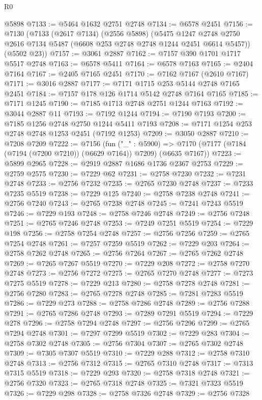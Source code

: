 \begin{lexlean}{R0}
\begin{coremodule}
    @5898
@7133 := @5464 @1632 @2751 @2748
@7134 := @6578 @2451
@7156 := @7130
    (@7133
      (@2617 @7134)
      (@2556 @5898)
      (@5475 @1247 @2748 @2750 @2616 @7134 @5487 (@6608 @253 @2748 @2748 @1244 @2451 @6614 @5457))
      (@5502 @23))
@7157 := @3061 @2887
@7162 := @7157 @390 @1701 @1717 @5517 @2748
@7163 := @6578 @5411
@7164 := @6578 @7163
@7165 := @2404 @7164
@7167 := @2405 @7165 @2451
@7170 := @7162 @7167 (@2610 @7167)
@7171 := @3016 @2887
@7177 := @7171 @1715 @253 @5144 @2748 @7165 @2451
@7184 := @7157 @178 @126 @1714 @5142 @2748 @7164 @7165
@7185 := @7171 @1245
@7190 := @7185 @1713 @2748 @2751 @1244 @7163
@7192 := @3044 @2887 @11
@7193 := @7192 @1244
@7194 := @7190 @7193
@7200 := @7185 @1256 @2748 @2750 @1244 @5411 @7193
@7208 := @7171 @1254 @253 @2748 @2748 @1253 @2451 (@7192 @1253)
@7209 := @3050 @2887
@7210 := @7208 @7209
@7222 := @7156
    (fun ("_" : @5900) =>
    @7170 (@7177 (@7184 (@7194 (@7200 @7210)) (@6629 @7164)) @7209) (@6635 @7167))
@7223 := @5899 @2965
@7228 := @2919 @2887 @1686 @1736 @2367 @2753
@7229 := @2759 @2575
@7230 := @7229 @62
@7231 := @2758 @7230
@7232 := @7231 @2748
@7233 := @2756 @7232
@7235 := @2765 @7230 @2748
@7237 := @7233 @7235 @5519
@7238 := @7229 @125
@7240 := @2758 @7238 @2748
@7241 := @2756 @7240
@7243 := @2765 @7238 @2748
@7245 := @7241 @7243 @5519
@7246 := @7229 @193
@7248 := @2758 @7246 @2748
@7249 := @2756 @7248
@7251 := @2765 @7246 @2748
@7253 := @7249 @7251 @5519
@7254 := @7229 @198
@7256 := @2758 @7254 @2748
@7257 := @2756 @7256
@7259 := @2765 @7254 @2748
@7261 := @7257 @7259 @5519
@7262 := @7229 @203
@7264 := @2758 @7262 @2748
@7265 := @2756 @7264
@7267 := @2765 @7262 @2748
@7269 := @7265 @7267 @5519
@7270 := @7229 @208
@7272 := @2758 @7270 @2748
@7273 := @2756 @7272
@7275 := @2765 @7270 @2748
@7277 := @7273 @7275 @5519
@7278 := @7229 @213
@7280 := @2758 @7278 @2748
@7281 := @2756 @7280
@7283 := @2765 @7278 @2748
@7285 := @7281 @7283 @5519
@7286 := @7229 @273
@7288 := @2758 @7286 @2748
@7289 := @2756 @7288
@7291 := @2765 @7286 @2748
@7293 := @7289 @7291 @5519
@7294 := @7229 @278
@7296 := @2758 @7294 @2748
@7297 := @2756 @7296
@7299 := @2765 @7294 @2748
@7301 := @7297 @7299 @5519
@7302 := @7229 @283
@7304 := @2758 @7302 @2748
@7305 := @2756 @7304
@7307 := @2765 @7302 @2748
@7309 := @7305 @7307 @5519
@7310 := @7229 @288
@7312 := @2758 @7310 @2748
@7313 := @2756 @7312
@7315 := @2765 @7310 @2748
@7317 := @7313 @7315 @5519
@7318 := @7229 @293
@7320 := @2758 @7318 @2748
@7321 := @2756 @7320
@7323 := @2765 @7318 @2748
@7325 := @7321 @7323 @5519
@7326 := @7229 @298
@7328 := @2758 @7326 @2748
@7329 := @2756 @7328

\end{coremodule}
\end{lexlean}
